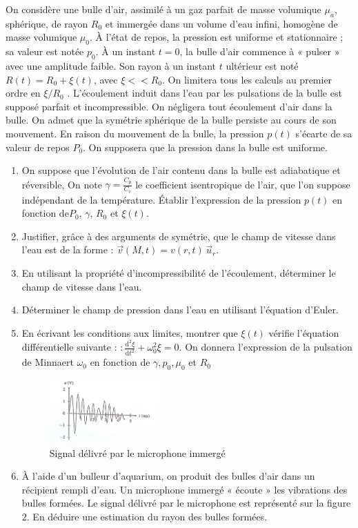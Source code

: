 \documentclass{article}
\begin{document}
On considère une bulle d’air, assimilé à un gaz parfait de masse volumique $\mu_a$, sphérique,
de rayon $R_0$ et immergée dans un volume d’eau infini, homogène de masse volumique $\mu_0$. À
l’état de repos, la pression est uniforme et stationnaire ; sa valeur est notée $p_0$. 
À un instant $t=0$, la bulle d’air commence à « pulser » avec une amplitude faible. Son rayon
à un instant $t$ ultérieur est noté $R(t)=R_0 + \xi (t)$, avec $\xi << R_0$. On limitera tous les calculs
au premier ordre en $\xi / R_0$ . L’écoulement induit dans l’eau par les pulsations de la bulle
est supposé parfait et incompressible. On négligera tout écoulement d’air dans la bulle. On
admet que la symétrie sphérique de la bulle persiste au cours de son mouvement. En raison
du mouvement de la bulle, la pression $p(t)$ s’écarte de sa valeur de repos $P_0$. On supposera que la pression dans la bulle est uniforme. 


\begin{enumerate}
  \item On suppose que l’évolution de l’air contenu dans la bulle est adiabatique et réversible,
  On note $\gamma = \frac{C_p}{C_v}$ le coefficient isentropique de l’air, que l’on suppose indépendant de la
  température.
  Établir l’expression de la pression $p(t)$ en fonction de$P_0$, $\gamma$,  $R_0$ et $\xi(t)$.
  \item Justifier, grâce à des arguments de symétrie, que le champ de vitesse dans l’eau est de la
  forme : $\vec{v}(M,t)=v(r,t)\,\vec{u}_r$.
  \item En utilisant la propriété d’incompressibilité de l’écoulement, déterminer le champ de vitesse
  dans l’eau.
  \item Déterminer le champ de pression dans l’eau en utilisant l’équation d’Euler.
  \item En écrivant les conditions aux limites, montrer que $\xi(t)$ vérifie l’équation différentielle
  suivante : $:\frac{{\mathrm{d}}^{2}\xi}{{\mathrm{d}t}^{2}}+{\omega}_{0}^{2}\xi=0.$
  On donnera l’expression de la pulsation de Minnaert $\omega_0$ en fonction de $\gamma, p_0, \mu_0 $ et $ R_0$

  \begin{figure}[h]
    \centering
    \includegraphics[width=0.4\textwidth]{bulles.png}
    \caption{Signal délivré par le microphone immergé}
    \label{fig:bulles}
  \end{figure}
  
  \item À l’aide d’un bulleur d’aquarium, on produit des bulles d’air dans un récipient rempli
    d’eau. Un microphone immergé « écoute » les vibrations des bulles formées. Le signal délivré
    par le microphone est représenté sur la figure 2. En déduire une estimation du rayon des
    bulles formées.

\end{enumerate}
  
\end{document}
